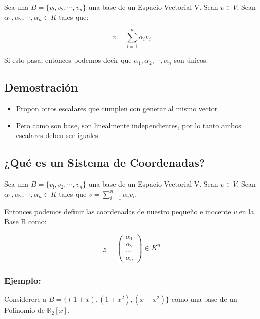 \documentclass[12pt]{report}                                %
\begin{document}
        Sea una $B = \{ v_!, v_2, \cdots, v_n\}$ una base de un Espacio Vectorial V.
        Sean $v \in V$.
        Sean $\alpha_1, \alpha_2, \cdots, \alpha_n \in K$ tales que:

        \begin{equation}
            v = \sum_{i=1}^{n} \alpha_i v_i
        \end{equation}

        Si esto pasa, entonces podemos decir que  $\alpha_1, \alpha_2, \cdots, \alpha_n$ son únicos.

        \subsection{Demostración}
        \begin{itemize}
            \item Propon otros escalares que cumplen con generar al mismo vector
            \item Pero como son base, son linealmente independientes, por lo tanto ambos escalares deben ser iguales
        \end{itemize}


        \subsection{¿Qué es un Sistema de Coordenadas?}
        Sea una $B = \{ v_!, v_2, \cdots, v_n\}$ una base de un Espacio Vectorial V.
        Sean $v \in V$.
        Sean $\alpha_1, \alpha_2, \cdots, \alpha_n \in K$ tales que $v = \sum_{i=1}^{n} \alpha_i v_i$.

        Entonces podemos definir las coordenadas de nuestro pequeño e inocente $v$ en la Base B como:

        \begin{equation}
            [v]_B = 
            \begin{pmatrix} 
                \alpha_1    \\
                \alpha_2    \\
                \cdots      \\
                \alpha_n 
            \end{pmatrix}
            \in K^n
        \end{equation}


        \clearpage

        \subsubsection{Ejemplo:}
        Considerere a $B = \{ (1+x), (1+x^2) , (x + x^2) \}$ como una base de un Polinomio de $\mathbb{R}_2[x]$.
\end{document}
